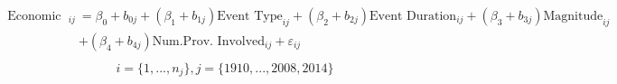 \begin{align}
\begin{split}
\text{Economic Cost}_{ij}&=\beta_0+b_{0j}+(\beta_{1}+b_{1j})\text{Event Type}_{ij}+(\beta_{2}+b_{2j})\text{Event Duration}_{ij}+(\beta_{3}+b_{3j})\text{Magnitude}_{ij}\\ &+(\beta_{4}+b_{4j})\text{Num.Prov. Involved}_{ij}+\varepsilon_{ij}\\
\end{split}
\label{econ_time}
\end{align}
\begin{equation*}
i=\{1,...,n_j\},
j=\{1910,...,2008, 2014\}
\end{equation*}

